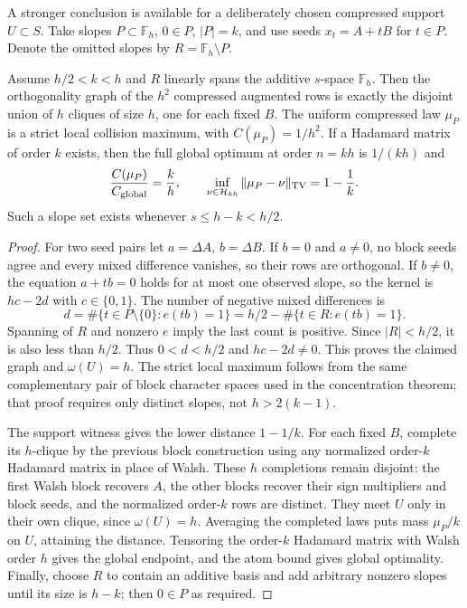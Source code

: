 A stronger conclusion is available for a deliberately chosen compressed
support $U\subset S$. Take slopes $P\subset\mathbb F_h$, $0\in P$,
$|P|=k$, and use seeds $x_t=A+tB$ for $t\in P$. Denote the omitted
slopes by $R=\mathbb F_h\setminus P$.
\begin{theorem}
\label{s25:thm:design-spanning-slopes}
Assume $h/2<k<h$ and $R$ linearly spans the additive $s$-space
$\mathbb F_h$. Then the orthogonality graph of the $h^2$ compressed
augmented rows is exactly the disjoint union of $h$ cliques of size $h$,
one for each fixed $B$.
The uniform compressed law $\mu_P$ is a strict local collision maximum,
with $C(\mu_P)=1/h^2$.
If a Hadamard matrix of order $k$ exists, then the full global optimum
at order $n=kh$ is $1/(kh)$ and
\[
 \frac{C(\mu_P)}{C_{\rm global}}=\frac{k}{h},\qquad
 \inf_{\nu\in\mathcal H_{kh}}\|\mu_P-\nu\|_{\rm TV}=1-\frac1k.
\]
Such a slope set exists whenever $s\le h-k<h/2$.
\end{theorem}
\begin{proof}
For two seed pairs let $a=\Delta A$, $b=\Delta B$.
If $b=0$ and $a\ne0$, no block seeds agree and every mixed difference
vanishes, so their rows are orthogonal. If $b\ne0$, the equation
$a+tb=0$ holds for at most one observed slope, so the kernel is
$h c-2d$ with $c\in\{0,1\}$. The number of negative mixed differences is
\[
 d=\#\{t\in P\setminus\{0\}:e(tb)=1\}
   =h/2-\#\{t\in R:e(tb)=1\}.
\]
Spanning of $R$ and nonzero $e$ imply the last count is positive.
Since $|R|<h/2$, it is also less than $h/2$. Thus $0<d<h/2$ and
$hc-2d\ne0$. This proves the claimed graph and $\omega(U)=h$.
The strict local maximum follows from the same complementary pair of
block character spaces used in the concentration theorem; that proof
requires only distinct slopes, not $h>2(k-1)$.

The support witness gives the lower distance $1-1/k$. For each fixed
$B$, complete its $h$-clique by the previous block construction using
any normalized order-$k$ Hadamard matrix in place of Walsh. These $h$
completions remain disjoint: the first Walsh block recovers $A$, the
other blocks recover their sign multipliers and block seeds, and the
normalized order-$k$ rows are distinct. They meet $U$ only in their
own clique, since $\omega(U)=h$. Averaging the completed laws puts
mass $\mu_P/k$ on $U$, attaining the distance. Tensoring the order-$k$
Hadamard matrix with Walsh order $h$ gives the global endpoint, and
the atom bound gives global optimality. Finally, choose $R$ to contain
an additive basis and add arbitrary nonzero slopes until its size is
$h-k$; then $0\in P$ as required.
\end{proof}

